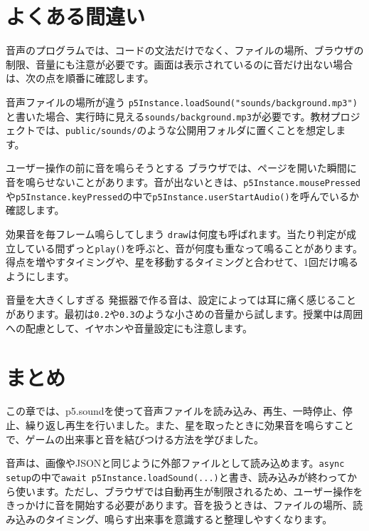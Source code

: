 \section{よくある間違い}

音声のプログラムでは、コードの文法だけでなく、ファイルの場所、ブラウザの制限、音量にも注意が必要です。画面は表示されているのに音だけ出ない場合は、次の点を順番に確認します。

\begin{mistakebox}{音声ファイルの場所が違う}
\texttt{p5Instance.loadSound("sounds/background.mp3")}と書いた場合、実行時に見える\texttt{sounds/background.mp3}が必要です。教材プロジェクトでは、\texttt{public/sounds/}のような公開用フォルダに置くことを想定します。
\end{mistakebox}

\begin{mistakebox}{ユーザー操作の前に音を鳴らそうとする}
ブラウザでは、ページを開いた瞬間に音を鳴らせないことがあります。音が出ないときは、\texttt{p5Instance.mousePressed}や\texttt{p5Instance.keyPressed}の中で\texttt{p5Instance.userStartAudio()}を呼んでいるか確認します。
\end{mistakebox}

\begin{mistakebox}{効果音を毎フレーム鳴らしてしまう}
\texttt{draw}は何度も呼ばれます。当たり判定が成立している間ずっと\texttt{play()}を呼ぶと、音が何度も重なって鳴ることがあります。得点を増やすタイミングや、星を移動するタイミングと合わせて、1回だけ鳴るようにします。
\end{mistakebox}

\begin{mistakebox}{音量を大きくしすぎる}
発振器で作る音は、設定によっては耳に痛く感じることがあります。最初は\texttt{0.2}や\texttt{0.3}のような小さめの音量から試します。授業中は周囲への配慮として、イヤホンや音量設定にも注意します。
\end{mistakebox}

\section{まとめ}

この章では、p5.soundを使って音声ファイルを読み込み、再生、一時停止、停止、繰り返し再生を行いました。また、星を取ったときに効果音を鳴らすことで、ゲームの出来事と音を結びつける方法を学びました。

音声は、画像やJSONと同じように外部ファイルとして読み込めます。\texttt{async setup}の中で\texttt{await p5Instance.loadSound(...)}と書き、読み込みが終わってから使います。ただし、ブラウザでは自動再生が制限されるため、ユーザー操作をきっかけに音を開始する必要があります。音を扱うときは、ファイルの場所、読み込みのタイミング、鳴らす出来事を意識すると整理しやすくなります。


